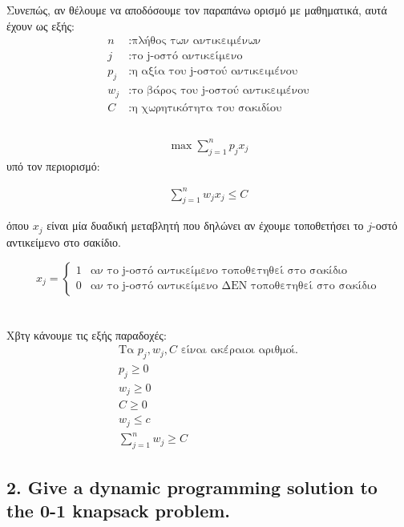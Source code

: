 \documentclass[12pt]{article}
\begin{document}
Συνεπώς, αν θέλουμε να αποδόσουμε τον παραπάνω ορισμό με μαθηματικά, αυτά έχουν ως εξής: \\

\begin{align*}
	n &: \text{πλήθος των αντικειμένων}  \\
	j  &: \text{το j-οστό αντικείμενο}  \\
 	p_{j} &: \text{η αξία του j-οστού αντικειμένου}  \\
 	w_{j} &: \text{το βάρος του j-οστού αντικειμένου}  \\
 	C &: \text{η χωρητικότητα του σακιδίου} \\
\end{align*} \\

\begin{align*}
	\max \sum_{j=1}^{n}{p_{j}x_{j}}
\end{align*}  
υπό τον περιορισμό:

\begin{align*}
	\sum_{j=1}^{n}{w_{j}x_{j}} \leq C
\end{align*}

όπου \(x_{j}\) είναι μία δυαδική μεταβλητή που δηλώνει αν έχουμε τοποθετήσει το \(j\)-οστό αντικείμενο στο σακίδιο.
 
 \[ x_{j} = 
 \begin{cases} 
 	1 & \text{αν το j-οστό αντικείμενο τοποθετηθεί στο σακίδιο} \\
 	0 & \text{αν το j-οστό αντικείμενο ΔΕΝ τοποθετηθεί στο σακίδιο}
 \end{cases}
 \]
\\ \\
Χβτγ κάνουμε τις εξής παραδοχές: \\
\begin{align*}
	\text{Τα } p_{j}, w_{j}, C \text{ είναι ακέραιοι αριθμοί.} \\
	 p_{j} \geq 0 \\
	 w_{j} \geq 0 \\
	 C \geq 0 \\
	 w_{j} \leq c \\
	 \sum_{j=1}^{n} w_{j} \geq C 
\end{align*}

\vspace{2in}

\pagebreak

\subsection*{2. Give a dynamic programming solution to the 0-1 knapsack problem.}
\end{document}
